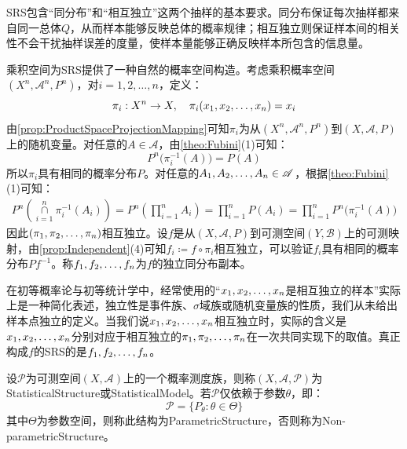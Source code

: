 \begin{note}
	SRS包含“同分布”和“相互独立”这两个抽样的基本要求。同分布保证每次抽样都来自同一总体$Q$，从而样本能够反映总体的概率规律；相互独立则保证样本间的相关性不会干扰抽样误差的度量，使样本量能够正确反映样本所包含的信息量。\par
	乘积空间为SRS提供了一种自然的概率空间构造。考虑乘积概率空间$(X^n,\mathscr{A}^n,P^n)$，对$i=1,2,\dots,n$，定义：
	\begin{equation*}
		\pi_i:X^n\to X,\quad\pi_i(x_1, x_2, \dots, x_{n})=x_i
	\end{equation*}
	由\cref{prop:ProductSpaceProjectionMapping}可知$\pi_i$为从$(X^n,\mathscr{A}^n,P^n)$到$(X,\mathscr{A},P)$上的随机变量。对任意的$A\in\mathscr{A}$，由\cref{theo:Fubini}(1)可知：
	\begin{equation*}
		P^n\Big(\pi_i^{-1}(A)\Big)=P(A)
	\end{equation*}
	所以$\pi_i$具有相同的概率分布$P$。对任意的$A_1, A_2, \dots, A_{n}\in\mathscr{A}$，根据\cref{theo:Fubini}(1)可知：
	\begin{align*}
		P^n\left(\underset{i=1}{\overset{n}{\cap}}\pi_i^{-1}(A_i)\right)=P^n\left(\prod_{i=1}^{n}A_i\right)=\prod_{i=1}^{n}P(A_i)=\prod_{i=1}^{n}P^n\Big(\pi_i^{-1}(A)\Big)
	\end{align*}
	因此$(\pi_1, \pi_2, \dots, \pi_{n})$相互独立。设$f$是从$(X,\mathscr{A},P)$到可测空间$(Y,\mathscr{B})$上的可测映射，由\cref{prop:Independent}(4)可知$f_i\coloneq f\circ\pi_i$相互独立，可以验证$f_i$具有相同的概率分布$Pf^{-1}$。称$f_1, f_2, \dots, f_{n}$为$f$的独立同分布副本。\par
	在初等概率论与初等统计学中，经常使用的“$x_1, x_2, \dots, x_{n}$是相互独立的样本”实际上是一种简化表述，独立性是事件族、$\sigma$域族或随机变量族的性质，我们从未给出样本点独立的定义。当我们说$x_1, x_2, \dots, x_{n}$相互独立时，实际的含义是$x_1, x_2, \dots, x_{n}$分别对应于相互独立的$\pi_1, \pi_2, \dots, \pi_{n}$在一次共同实现下的取值。真正构成$f$的SRS的是$f_1, f_2, \dots, f_{n}$。
\end{note}
\begin{definition}
	设$\mathscr{P}$为可测空间$(X,\mathscr{A})$上的一个概率测度族，则称$(X,\mathscr{A},\mathscr{P})$为\gls{StatisticalStructure}或\gls{StatisticalModel}。若$\mathscr{P}$仅依赖于参数$\theta$，即：
	\begin{equation*}
		\mathscr{P}=\{P_{\theta}:\theta\in\Theta\}
	\end{equation*}
	其中$\Theta$为参数空间，则称此结构为\gls{ParametricStructure}，否则称为\gls{Non-parametricStructure}。
\end{definition}
